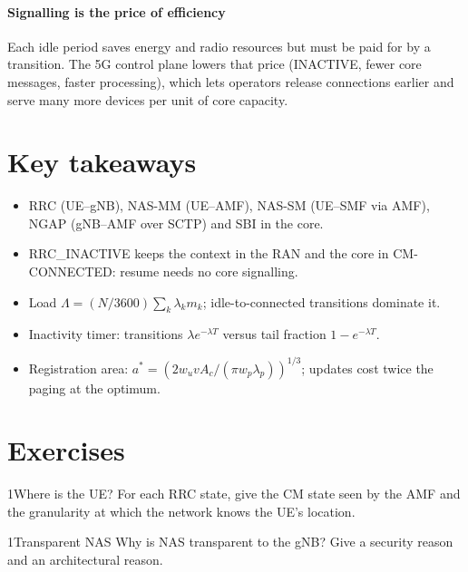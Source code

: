 \documentclass[11pt,a4paper]{article}
\begin{document}
\paragraph{Signalling is the price of efficiency} Each idle period saves energy and radio resources but must be paid for by a transition. The
5G control plane lowers that price (INACTIVE, fewer core messages, faster processing), which lets operators release connections earlier and
serve many more devices per unit of core capacity.

\section{Key takeaways}
\begin{takeawaybox}
\begin{itemize}
  \item RRC (UE--gNB), NAS-MM (UE--AMF), NAS-SM (UE--SMF via AMF), NGAP (gNB--AMF over SCTP) and SBI in the core.
  \item RRC\_INACTIVE keeps the context in the RAN and the core in CM-CONNECTED: resume needs no core signalling.
  \item Load $\Lambda = (N/3600)\sum_k \lambda_k m_k$; idle-to-connected transitions dominate it.
  \item Inactivity timer: transitions $\lambda e^{-\lambda T}$ versus tail fraction $1 - e^{-\lambda T}$.
  \item Registration area: $a^{*} = (2w_u v A_c/(\pi w_p\lambda_p))^{1/3}$; updates cost twice the paging at the optimum.
\end{itemize}
\end{takeawaybox}

\section{Exercises}

\begin{exercisebox}{1}{Where is the UE?}\label{exr:states}
For each RRC state, give the CM state seen by the AMF and the granularity at which the network knows the UE's location.
\end{exercisebox}

\begin{exercisebox}{1}{Transparent NAS}\label{exr:nas}
Why is NAS transparent to the gNB? Give a security reason and an architectural reason.
\end{exercisebox}
\end{document}
